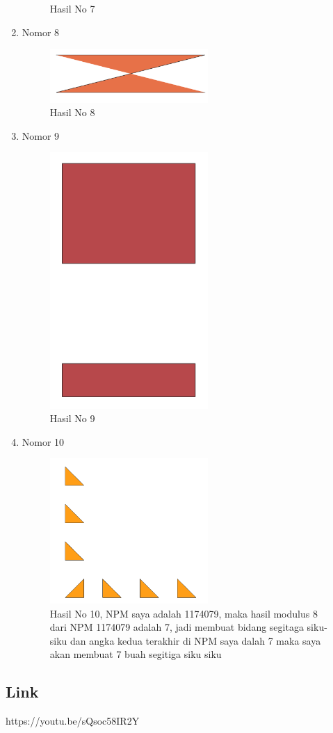 \begin{enumerate}
\begin{figure}[H]
		\centering
		\caption{Hasil No 7}
	\end{figure}
	\item Nomor 8
	
	\begin{figure}[H]
		\includegraphics[width=6cm]{figures/Tugas2/1174079/no8.PNG}
		\centering
		\caption{Hasil No 8}
	\end{figure}
	\item Nomor 9
	
	\begin{figure}[H]
		\includegraphics[width=6cm]{figures/Tugas2/1174079/no9.PNG}
		\centering
		\caption{Hasil No 9}
	\end{figure}
	\item Nomor 10
	
	\begin{figure}[H]
		\includegraphics[width=6cm]{figures/Tugas2/1174079/no10.PNG}
		\centering
		\caption{Hasil No 10, NPM saya adalah 1174079, maka hasil modulus 8 dari NPM 1174079 adalah 7, jadi membuat bidang segitaga siku-siku dan angka kedua terakhir di NPM saya dalah 7 maka saya akan membuat 7 buah segitiga siku siku}
	\end{figure}
\end{enumerate}
\subsection{Link}
	https://youtu.be/sQsoc58IR2Y